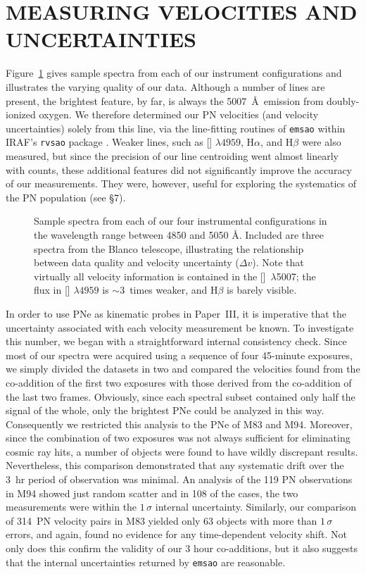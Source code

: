 \documentclass[12pt,preprint]{emulateapj}
\newcommand{\Oline}{[\ion{O}{3}]~$\lambda$5007}
\begin{document}
\section{MEASURING VELOCITIES AND UNCERTAINTIES}
Figure~\ref{spectra} gives sample spectra from each of our instrument configurations and illustrates the varying quality of our data.  Although a number of lines are present, the brightest feature, by far, is always the 5007~\AA\ emission from doubly-ionized oxygen.  We therefore determined our PN velocities (and velocity uncertainties) solely from this line, via the line-fitting routines of {\tt emsao} within IRAF's {\tt rvsao} package \citep{rvsao}.  Weaker lines, such as [] $\lambda 4959$, H$\alpha$, and H$\beta$ were also measured, but since the precision of our line centroiding went almost linearly with counts, these additional features did not significantly improve the accuracy of our measurements.  They were, however, useful for exploring the systematics of the PN population (see \S7). 

\begin{figure}
\caption{Sample spectra from each of our four instrumental configurations in the wavelength range between 4850 and 5050 \AA.  Included are three spectra from the Blanco telescope, illustrating the relationship between data quality and velocity uncertainty ($\Delta v$).  Note that virtually all velocity information is contained in the \Oline; the flux in [] $\lambda 4959$ is $\sim$3~times weaker, and H$\beta$ is barely visible. \label{spectra} }
\end{figure}

In order to use PNe as kinematic probes in Paper~III, it is imperative that the uncertainty associated with each velocity measurement be known.  To investigate this number, we began with a straightforward internal consistency check.  Since most of our spectra were acquired using a sequence of four 45-minute exposures, we simply divided the datasets in two and compared the velocities found from the co-addition of the first two exposures with those derived from the co-addition of the last two frames.  Obviously, since each spectral subset contained only half the signal of the whole, only the brightest PNe could be analyzed in this way.  Consequently  we restricted this analysis to the PNe of M83 and M94.  Moreover, since the combination of two exposures was not always sufficient for eliminating cosmic ray hits, a number of objects were found to have wildly discrepant results.  Nevertheless, this comparison demonstrated that any systematic drift over the 3~hr period of observation was minimal.  An analysis of the 119 PN observations in M94 showed just random scatter and in 108 of the cases, the two measurements were within the $1\,\sigma$ internal uncertainty.  Similarly, our comparison of 314~PN velocity pairs in M83 yielded only 63 objects with more than $1\,\sigma$ errors, and again, found no evidence for any time-dependent velocity shift.  Not only does this confirm the validity of our 3 hour co-additions, but it also suggests that the internal uncertainties returned by {\tt emsao} are reasonable.
\end{document}
